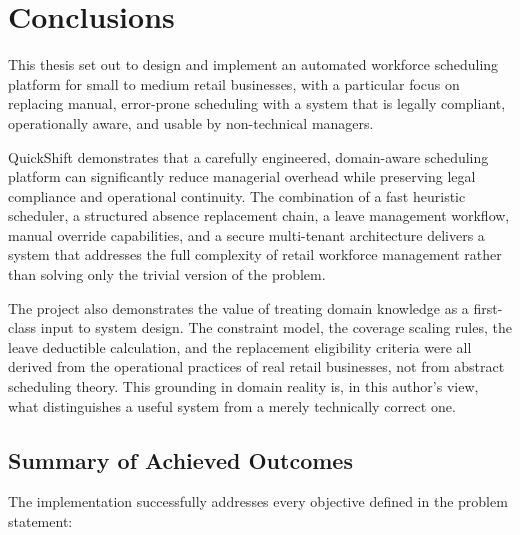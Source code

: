 \chapter{Conclusions}
\label{conclusions}

\par This thesis set out to design and implement an automated workforce scheduling platform for small to medium retail businesses, with a particular focus on replacing manual, error-prone scheduling with a system that is legally compliant, operationally aware, and usable by non-technical managers.\par QuickShift demonstrates that a carefully engineered, domain-aware scheduling platform can significantly reduce managerial overhead while preserving legal compliance and operational continuity. The combination of a fast heuristic scheduler, a structured absence replacement chain, a leave management workflow, manual override capabilities, and a secure multi-tenant architecture delivers a system that addresses the full complexity of retail workforce management rather than solving only the trivial version of the problem.

\par The project also demonstrates the value of treating domain knowledge as a first-class input to system design. The constraint model, the coverage scaling rules, the leave deductible calculation, and the replacement eligibility criteria were all derived from the operational practices of real retail businesses, not from abstract scheduling theory. This grounding in domain reality is, in this author's view, what distinguishes a useful system from a merely technically correct one.

\section{Summary of Achieved Outcomes}
\par The implementation successfully addresses every objective defined in the problem statement:

